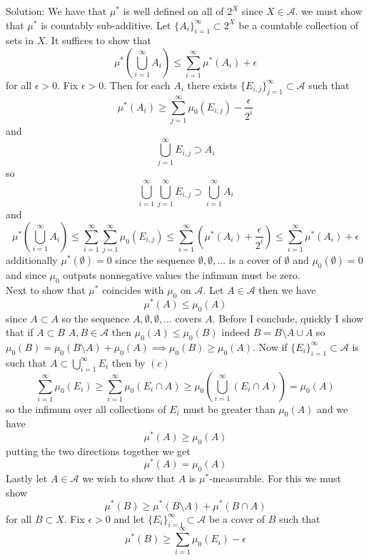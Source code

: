 \documentclass[11pt]{article}
\newcommand{\solution}[1]{{{\textcolor{header}{Solution:} \textcolor{solution}{#1}}}}
\begin{document}
\solution{
    We have that $\mu^{*}$ is well defined on all of $2^{X}$ since $X \in \mathcal{A}$. we must show that $\mu^{*}$ is countably sub-additive. 
    Let $\{A_i\}_{i=1}^{\infty} \subset 2^{X}$ be a countable collection of sets in $X$. It suffices to show that
    \[
        \mu^{*}(\bigcup_{i=1}^{\infty}A_i) \le \sum_{i=1}^{\infty}\mu^{*}(A_i) + \epsilon
    \] 
    for all $\epsilon > 0$. Fix $\epsilon > 0$. Then for each $A_i$ there exists  $\{E_{i,j}\}_{j=1}^{\infty} \subset \mathcal{A}$ such that 
    \[
        \mu^{*}(A_i) \ge \sum_{j=1}^{\infty}\mu_0(E_{i,j}) - \frac{\epsilon}{2^{i}}
    \] 
    and
    \[
        \bigcup_{j=1}^{\infty}E_{i,j} \supset A_i
    \] 
    so
    \[
        \bigcup_{i=1}^{\infty}\bigcup_{j=1}^{\infty}E_{i,j} \supset \bigcup_{i=1}^{\infty}A_i
    \] 
    and
    \[
        \mu^{*}(\bigcup_{i=1}^{\infty}A_i) \le \sum_{i=1}^{\infty}\sum_{j=1}^{\infty}\mu_0(E_{i,j}) \le \sum_{i=1}^{\infty}(\mu^{*}(A_i) + \frac{\epsilon}{2^{i}}) \le \sum_{i=1}^{\infty}\mu^{*}(A_i) + \epsilon
    \] 
    additionally $\mu^{*}(\emptyset) = 0$ since the sequence $\emptyset, \emptyset, \dots$ is a cover of  $\emptyset$ and  $\mu_0(\emptyset) = 0$ and since $\mu_0$ outputs nonnegative values the infimum must be zero.\\
    Next to show that $\mu^{*}$ coincides with $\mu_0$ on $ \mathcal{A}$. Let $A \in \mathcal{A}$ then we have
    \[
    \mu^{*}(A) \le \mu_0(A)
    \] 
    since $A \subset A$ so the sequence $A, \emptyset, \emptyset, \dots$ covers  $A$.
    Before I conclude, quickly I show that if $A \subset B$ $A,B \in \mathcal{A}$ then $\mu_0(A) \le \mu_0(B)$ indeed $B = B \setminus A \cup A$ so  $\mu_0(B) = \mu_0(B \setminus A) + \mu_0(A) \implies \mu_0(B) \ge \mu_0(A)$.
    Now if $\{E_i\}_{i=1}^{\infty} \subset \mathcal{A}$ is such that $A \subset \bigcup_{i=1}^{\infty}E_i$ then by $(c)$ 
     \[
         \sum_{i=1}^{\infty}\mu_0(E_i) \ge \sum_{i=1}^{\infty}\mu_0(E_i \cap A) \ge \mu_0(\bigcup_{i=1}^{\infty}(E_i \cap A)) = \mu_0(A)
    \] 
    so the infimum over all collections of $E_i$ must be greater than  $\mu_0(A)$ and we have
    \[
    \mu^{*}(A) \ge \mu_0(A)
    \] 
    putting the two directions together we get
    \[
    \mu^{*}(A) = \mu_0(A)
    \] 
    Lastly let $A \in \mathcal{A}$ we wish to show that $A$ is $\mu^{*}$-measurable. For this we must show
    \[
    \mu^{*}(B) \ge \mu^{*}(B \setminus A) + \mu^{*}(B \cap A)
    \] 
    for all $B \subset X$. Fix $\epsilon > 0$ and let $\{E_i\}_{i=1}^{\infty} \subset \mathcal{A}$ be a cover of $B$ such that
     \[
    \mu^{*}(B) \ge \sum_{i=1}^{\infty}\mu_0(E_i) - \epsilon
\]}
\end{document}
